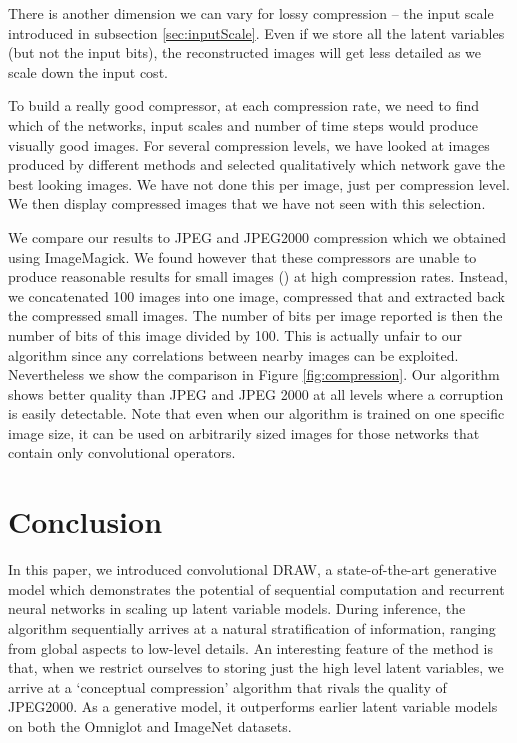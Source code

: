 \documentclass{article}
\begin{document}
There is another dimension we can vary for lossy compression -- the input scale introduced in subsection \ref{sec:inputScale}. Even if we store all the latent variables (but not the input bits), the reconstructed images will get less detailed as we scale down the input cost. 

To build a really good compressor, at each compression rate, we need to find which of the networks, input scales and number of time steps would produce visually good images. For several compression levels, we have looked at images produced by different methods and selected qualitatively which network gave the best looking images. We have not done this per image, just per compression level. We then display compressed images that we have not seen with this selection.

We compare our results to JPEG and JPEG2000 compression which we obtained using ImageMagick. We found however that these compressors are unable to produce reasonable results for small images () at high compression rates. Instead, we concatenated 100 images into one  image, compressed that and extracted back the compressed small images. The number of bits per image reported is then the number of bits of this image divided by 100. This is actually unfair to our algorithm since any correlations between nearby images can be exploited. Nevertheless we show the comparison in Figure \ref{fig:compression}. Our algorithm shows better quality than JPEG and JPEG 2000 at all levels where a corruption is easily detectable. Note that even when our algorithm is trained on one specific image size, it can be used on arbitrarily sized images for those networks that contain only convolutional operators. 



\section{Conclusion}

In this paper, we introduced convolutional DRAW, a state-of-the-art generative model which demonstrates the potential of sequential computation and recurrent neural networks in scaling up latent variable models. During inference, the algorithm sequentially arrives at a natural stratification of information, ranging from global aspects to low-level details. An interesting feature of the method is that, when we restrict ourselves to storing just the high level latent variables, we arrive at a `conceptual compression' algorithm that rivals the quality of JPEG2000. As a generative model, it outperforms earlier latent variable models on both the Omniglot and ImageNet datasets.
\end{document}
